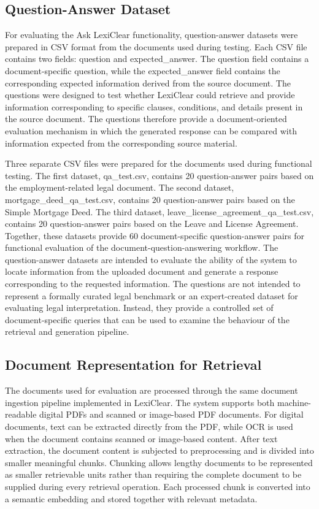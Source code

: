 \documentclass[12pt,a4paper,oneside]{report}
\begin{document}
\subsection{Question-Answer Dataset}

For evaluating the Ask LexiClear functionality, question-answer datasets were
prepared in CSV format from the documents used during testing. Each CSV file
contains two fields: question and expected\_answer. The
question field contains a document-specific question, while the
expected\_answer field contains the corresponding expected information
derived from the source document. The questions were designed to test whether LexiClear could retrieve and
provide information corresponding to specific clauses, conditions, and
details present in the source document. The questions therefore provide a
document-oriented evaluation mechanism in which the generated response can be
compared with information expected from the corresponding source material.

Three separate CSV files were prepared for the documents used during
functional testing. The first dataset, qa\_test.csv, contains
20 question-answer pairs based on the employment-related legal document.
The second dataset, mortgage\_deed\_qa\_test.csv, contains 20
question-answer pairs based on the Simple Mortgage Deed. The third dataset,
leave\_license\_agreement\_qa\_test.csv, contains 20 question-answer
pairs based on the Leave and License Agreement. Together, these datasets
provide 60 document-specific question-answer pairs for functional evaluation
of the document-question-answering workflow. The question-answer datasets are intended to evaluate the ability of the
system to locate information from the uploaded document and generate a
response corresponding to the requested information. The questions are not
intended to represent a formally curated legal benchmark or an expert-created
dataset for evaluating legal interpretation. Instead, they provide a
controlled set of document-specific queries that can be used to examine the
behaviour of the retrieval and generation pipeline.

\subsection{Document Representation for Retrieval}

The documents used for evaluation are processed through the same document
ingestion pipeline implemented in LexiClear. The system supports both
machine-readable digital PDFs and scanned or image-based PDF documents. For
digital documents, text can be extracted directly from the PDF, while OCR is
used when the document contains scanned or image-based content. After text extraction, the document content is subjected to preprocessing and
is divided into smaller meaningful chunks. Chunking allows lengthy documents
to be represented as smaller retrievable units rather than requiring the
complete document to be supplied during every retrieval operation. Each
processed chunk is converted into a semantic embedding and stored together
with relevant metadata.
\end{document}
